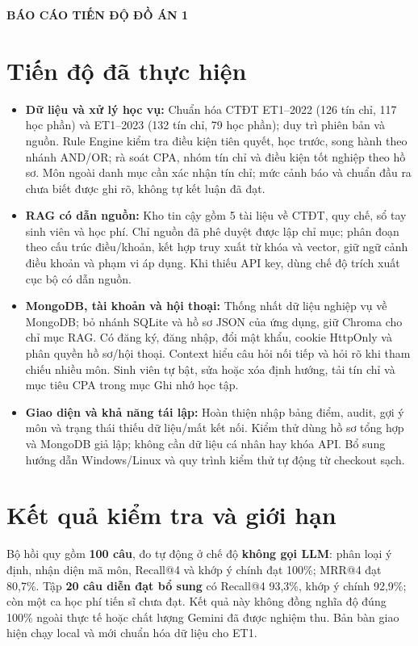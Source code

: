 \documentclass[11pt,a4paper]{article}
\begin{document}
\setcounter{page}{1}

\begin{center}
  {\bfseries\fontsize{15}{18}\selectfont BÁO CÁO TIẾN ĐỘ ĐỒ ÁN 1}\par
\end{center}
\vspace{0.35cm}

\section{Tiến độ đã thực hiện}
\begin{itemize}
  \item \textbf{Dữ liệu và xử lý học vụ:} Chuẩn hóa CTĐT ET1--2022 (126 tín chỉ, 117 học phần) và ET1--2023 (132 tín chỉ, 79 học phần); duy trì phiên bản và nguồn. Rule Engine kiểm tra điều kiện tiên quyết, học trước, song hành theo nhánh AND/OR; rà soát CPA, nhóm tín chỉ và điều kiện tốt nghiệp theo hồ sơ. Môn ngoài danh mục cần xác nhận tín chỉ; mức cảnh báo và chuẩn đầu ra chưa biết được ghi rõ, không tự kết luận đã đạt.
  \item \textbf{RAG có dẫn nguồn:} Kho tin cậy gồm 5 tài liệu về CTĐT, quy chế, sổ tay sinh viên và học phí. Chỉ nguồn đã phê duyệt được lập chỉ mục; phân đoạn theo cấu trúc điều/khoản, kết hợp truy xuất từ khóa và vector, giữ ngữ cảnh điều khoản và phạm vi áp dụng. Khi thiếu API key, dùng chế độ trích xuất cục bộ có dẫn nguồn.
  \item \textbf{MongoDB, tài khoản và hội thoại:} Thống nhất dữ liệu nghiệp vụ về MongoDB; bỏ nhánh SQLite và hồ sơ JSON của ứng dụng, giữ Chroma cho chỉ mục RAG. Có đăng ký, đăng nhập, đổi mật khẩu, cookie HttpOnly và phân quyền hồ sơ/hội thoại. Context hiểu câu hỏi nối tiếp và hỏi rõ khi tham chiếu nhiều môn. Sinh viên tự bật, sửa hoặc xóa định hướng, tải tín chỉ và mục tiêu CPA trong mục Ghi nhớ học tập.
  \item \textbf{Giao diện và khả năng tái lập:} Hoàn thiện nhập bảng điểm, audit, gợi ý môn và trạng thái thiếu dữ liệu/mất kết nối. Kiểm thử dùng hồ sơ tổng hợp và MongoDB giả lập; không cần dữ liệu cá nhân hay khóa API. Bổ sung hướng dẫn Windows/Linux và quy trình kiểm thử tự động từ checkout sạch.
\end{itemize}
\section{Kết quả kiểm tra và giới hạn}
Bộ hồi quy gồm \textbf{100 câu}, đo tự động ở chế độ \textbf{không gọi LLM}: phân loại ý định, nhận diện mã môn, Recall@4 và khớp ý chính đạt 100\%; MRR@4 đạt 80,7\%. Tập \textbf{20 câu diễn đạt bổ sung} có Recall@4 93,3\%, khớp ý chính 92,9\%; còn một ca học phí tiến sĩ chưa đạt. Kết quả này không đồng nghĩa độ đúng 100\% ngoài thực tế hoặc chất lượng Gemini đã được nghiệm thu. Bản bàn giao hiện chạy local và mới chuẩn hóa dữ liệu cho ET1.
\end{document}
